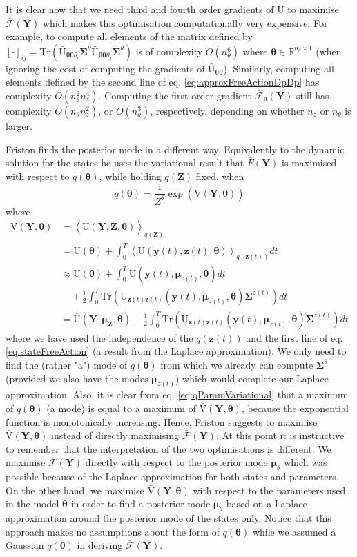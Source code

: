 \documentclass[a4paper,10pt]{article}
\newcommand{\bs}[1]{\mathbf{#1}}					%
\newcommand{\bgs}[1]{\boldsymbol{#1}}				%
\newcommand{\eq}[1]{\begin{equation} #1 \end{equation}}%
\newcommand{\trace}[1]{\mathrm{Tr}\left(#1\right)}					%
\renewcommand{\ss}{z}         %
\newcommand{\so}{y}         %
\renewcommand{\sp}{\theta}    %
\newcommand{\ps}{\bs{\ss}}    %
\newcommand{\po}{\bs{\so}}    %
\newcommand{\pp}{\bgs{\sp}} %
\newcommand{\Ps}{\bs{Z}}    %
\newcommand{\Po}{\bs{Y}}    %
\newcommand{\E}[2][]{\left\langle #2 \right\rangle_{#1}}	%
\newcommand{\U}{\mathrm{U}}			%
\newcommand{\Ua}{\bar{\mathrm{U}}}		%
\newcommand{\Va}{\bar{\mathrm{V}}}		%
\newcommand{\Fa}{\bar{\mathcal{F}}}		%
\newcommand{\R}{\mathbb{R}}				%
\newcommand{\Cov}{\bgs{\Sigma}}			%
\begin{document}
It is clear now that we need third and fourth order gradients of $\U$ to maximise $\Fa(\Po)$ which makes this optimisation computationally very expensive. For example, to compute all elements of the matrix defined by $[\cdot]_{ij} = \trace{\Ua_{\pp\pp\sp_i}\Cov^\sp\Ua_{\pp\pp\sp_j}\Cov^\sp}$ is of complexity $O(n_\sp^6)$ where $\pp \in \R^{n_\sp\times 1}$ (when ignoring the cost of computing the gradients of $\Ua_{\pp\pp}$). Similarly, computing all elements defined by the second line of eq. \eqref{eq:approxFreeActionDpDp} has complexity $O(n_\sp^2n_\ss^4)$. Computing the first order gradient $\Fa_{\pp}(\Po)$ still has complexity $O(n_\sp n_\ss^2)$, or $O(n_\sp^3)$, respectively, depending on whether $n_\ss$ or $n_\sp$ is larger.

Friston finds the posterior mode in a different way. Equivalently to the dynamic solution for the states he uses the variational result that $\bar{F}(\Po)$ is maximised with respect to $q(\pp)$, while holding $q(\Ps)$ fixed, when
\eq{\label{eq:qParamVariational}
    q(\pp) = \frac{1}{Z^\sp} \exp(\Va(\Po,\pp))
}
where
\begin{align}
    \Va(\Po,\pp) &= \E[q(\Ps)]{\Ua(\Po,\Ps,\pp)}\\
    &= \U(\pp) + \int_0^T \E[q(\ps(t))]{\U(\po(t),\ps(t),\pp)} dt\\
    &\approx \U(\pp) + \int_0^T \U(\po(t),\bgs{\mu}_{\ss(t)},\pp) dt \nonumber\\
    &\quad + \frac{1}{2}\int_0^T \trace{\U_{\ps(t)\ps(t)}(\po(t),\bgs{\mu}_{\ss(t)},\pp)\Cov^{\ss(t)}} dt\\
    &= \label{eq:approxVarAction} \Ua(\Po,\bgs{\mu}_\Ps,\pp) + \frac{1}{2}\int_0^T \trace{\U_{\ps(t)\ps(t)}(\po(t),\bgs{\mu}_{\ss(t)},\pp)\Cov^{\ss(t)}}dt
\end{align}
where we have used the independence of the $q(\ps(t))$ and the first line of eq. \eqref{eq:stateFreeAction} (a result from the Laplace approximation). We only need to find the (rather "a") mode of $q(\pp)$ from which we already can compute $\Cov^\sp$ (provided we also have the modes $\bgs{\mu}_{\ss(t)}$) which would complete our Laplace approximation. Also, it is clear from eq. \eqref{eq:qParamVariational} that a maximum of $q(\pp)$ (a mode) is equal to a maximum of $\Va(\Po,\pp)$, because the exponential function is monotonically increasing. Hence, Friston suggests to maximise $\Va(\Po,\pp)$ instead of directly maximising $\Fa(\Po)$. At this point it is instructive to remember that the interpretation of the two optimisations is different. We maximise $\Fa(\Po)$ directly with respect to the posterior mode $\bgs{\mu}_\sp$ which was possible because of the Laplace approximation for both states and parameters. On the other hand, we maximise $\Va(\Po,\pp)$ with respect to the parameters used in the model $\pp$ in order to find a posterior mode $\bgs{\mu}_\sp$ based on a Laplace approximation around the posterior mode of the states only. Notice that this approach makes no assumptions about the form of $q(\pp)$ while we assumed a Gaussian $q(\pp)$ in deriving $\Fa(\Po)$.
\end{document}
